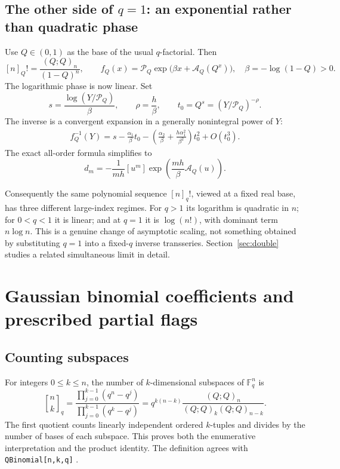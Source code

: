 \documentclass[11pt]{article}
\numberwithin{equation}{section}
\theoremstyle{definition}
\newcommand{\F}{\mathbb F}
\newcommand{\coef}[2]{[#1^{#2}]}
\newcommand{\qbin}[2]{\genfrac{[}{]}{0pt}{}{#1}{#2}_{q}}
\newcommand{\pp}[1]{(Q;Q)_{#1}}
\newcommand{\Pinf}{\mathcal P_Q}
\newcommand{\A}{\mathcal A_Q}
\begin{document}
\subsection{The other side of \texorpdfstring{$q=1$}{q = 1}: an exponential rather than quadratic phase}
\label{sec:qfactorial-smallbase}

Use $Q\in(0,1)$ as the base of the usual $q$-factorial. Then
\begin{equation}\label{eq:smallbase-factorial}
 [n]_Q!=\frac{\pp{n}}{(1-Q)^n},\qquad
 f_Q(x)=\Pinf\exp\bigl(\beta x+\A(Q^x)\bigr),
 \quad \beta=-\log(1-Q)>0.
\end{equation}
The logarithmic phase is now linear. Set
\begin{equation}\label{eq:smallbase-center}
 s=\frac{\log(Y/\Pinf)}\beta,\qquad
 \rho=\frac h\beta,\qquad
 t_0=Q^s=(Y/\Pinf)^{-\rho}.
\end{equation}
The inverse is a convergent expansion in a generally nonintegral power of $Y$:
\begin{align}\label{eq:smallbase-inverse}
 f_Q^{-1}(Y)=s
 -\frac{\alpha_1}{\beta}t_0
 -\left(\frac{\alpha_2}{\beta}
       +\frac{h\alpha_1^2}{\beta^2}\right)t_0^2
 +O(t_0^3).
\end{align}
The exact all-order formula simplifies to
\begin{equation}\label{eq:linear-extraction}
 d_m=-\frac1{mh}\coef{u}{m}\exp\left(\frac{mh}{\beta}\A(u)\right).
\end{equation}

Consequently the same polynomial sequence $[n]_q!$, viewed at a fixed real base, has three different large-index regimes. For $q>1$ its logarithm is quadratic in $n$; for $0<q<1$ it is linear; and at $q=1$ it is $\log(n!)$, with dominant term $n\log n$. This is a genuine change of asymptotic scaling, not something obtained by substituting $q=1$ into a fixed-$q$ inverse transseries. Section~\ref{sec:double} studies a related simultaneous limit in detail.

\section{Gaussian binomial coefficients and prescribed partial flags}
\label{sec:gaussian}

\subsection{Counting subspaces}

For integers $0\le k\le n$, the number of $k$-dimensional subspaces of $\F_q^n$ is
\begin{equation}\label{eq:qbin-count}
 \qbin{n}{k}
 =\frac{\prod_{j=0}^{k-1}(q^n-q^j)}
        {\prod_{j=0}^{k-1}(q^k-q^j)}
 =q^{k(n-k)}\frac{\pp{n}}{\pp{k}\pp{n-k}}.
\end{equation}
The first quotient counts linearly independent ordered $k$-tuples and divides by the number of bases of each subspace. This proves both the enumerative interpretation and the product identity. The definition agrees with \texttt{QBinomial[n,k,q]} \cite{wolframqbin}.
\end{document}
